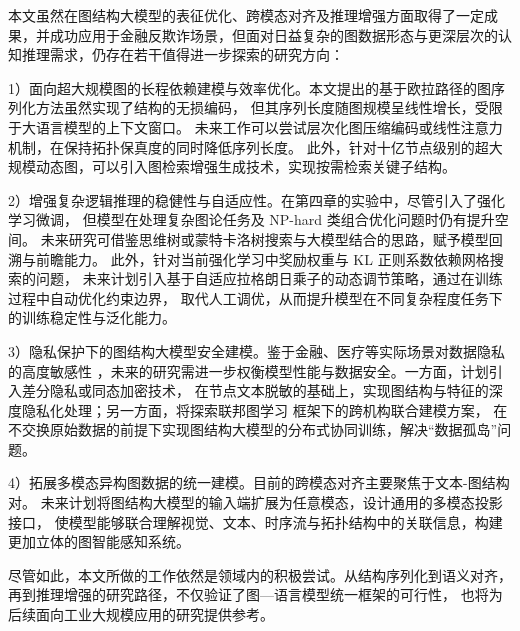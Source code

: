 本文虽然在图结构大模型的表征优化、跨模态对齐及推理增强方面取得了一定成果，并成功应用于金融反欺诈场景，但面对日益复杂的图数据形态与更深层次的认知推理需求，仍存在若干值得进一步探索的研究方向：

1）面向超大规模图的长程依赖建模与效率优化。本文提出的基于欧拉路径的图序列化方法虽然实现了结构的无损编码，
但其序列长度随图规模呈线性增长，受限于大语言模型的上下文窗口。
未来工作可以尝试层次化图压缩编码或线性注意力机制，在保持拓扑保真度的同时降低序列长度。
此外，针对十亿节点级别的超大规模动态图，可以引入图检索增强生成技术，实现按需检索关键子结构。

2）增强复杂逻辑推理的稳健性与自适应性。在第四章的实验中，尽管引入了强化学习微调，
但模型在处理复杂图论任务及 NP-hard 类组合优化问题时仍有提升空间。
未来研究可借鉴思维树或蒙特卡洛树搜索与大模型结合的思路，赋予模型回溯与前瞻能力。
此外，针对当前强化学习中奖励权重与 KL 正则系数依赖网格搜索的问题，
未来计划引入基于自适应拉格朗日乘子的动态调节策略，通过在训练过程中自动优化约束边界，
取代人工调优，从而提升模型在不同复杂程度任务下的训练稳定性与泛化能力。

3）隐私保护下的图结构大模型安全建模。鉴于金融、医疗等实际场景对数据隐私的高度敏感性
，未来的研究需进一步权衡模型性能与数据安全。一方面，计划引入差分隐私或同态加密技术，
在节点文本脱敏的基础上，实现图结构与特征的深度隐私化处理；另一方面，将探索联邦图学习
框架下的跨机构联合建模方案，
在不交换原始数据的前提下实现图结构大模型的分布式协同训练，解决“数据孤岛”问题。

4）拓展多模态异构图数据的统一建模。目前的跨模态对齐主要聚焦于文本-图结构对。
未来计划将图结构大模型的输入端扩展为任意模态，设计通用的多模态投影接口，
使模型能够联合理解视觉、文本、时序流与拓扑结构中的关联信息，构建更加立体的图智能感知系统。

尽管如此，本文所做的工作依然是领域内的积极尝试。从结构序列化到语义对齐，
再到推理增强的研究路径，不仅验证了图—语言模型统一框架的可行性，
也将为后续面向工业大规模应用的研究提供参考。